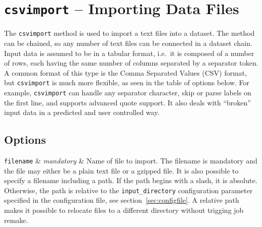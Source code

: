 


\section{\texttt{csvimport} -- Importing Data Files}
The \texttt{csvimport} method is used to import a text files into a
dataset.  The method can be chained, so any number of text files can
be connected in a dataset chain.  Input data is assumed to be in a
tabular format, i.e.\ it is composed of a number of rows, each having
the same number of columns separated by a separator token.  A common
format of this type is the Comma Separated Values (CSV) format, but
\texttt{csvimport} is much more flexible, as seen in the table of
options below.  For example, \texttt{csvimport} can handle any
separator character, skip or parse labels on the first line, and
supports advanced quote support.  It also deals with ``broken'' input
data in a predicted and user controlled way.


\subsection{Options}
\starttable
  \RP \texttt{filename} & \emph{mandatory} & Name of file to import.  The
  filename is mandatory and the file may either be a plain text file
  or a gzipped file.  It is also possible to specify a filename
  including a path.  If the path begins with a slash, it is absolute.
  Otherwise, the path is relative to the \texttt{input\_directory}
  configuration parameter specified in the configuration
  file, see section~\ref{sec:configfile}.  A relative path makes it
  possible to relocate files to a different directory without trigging
  job remake.\\

